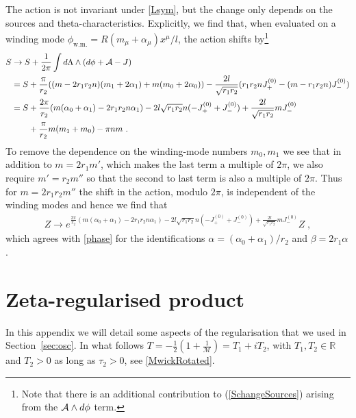 \documentclass[11pt]{article}
\numberwithin{equation}{section}
\begin{document}
\begin{appendix}
The action is not invariant under \eqref{Lsym}, but the change only depends on the sources and theta-characteristics.  Explicitly, we find that, when evaluated on  a winding mode $\phi_{\text{w.m.}}=R(m_\mu+\alpha_\mu)x^\mu/l$, the action shifts by\footnote{Note that there is an additional contribution to (\ref{SchangeSources}) arising from the ${\cal A}\wedge d\phi$ term.}
\begin{align}
S &\to S + \frac{1}{2\pi}\int d\Lambda\wedge (d\phi+{\cal A}-J)  \nonumber\\
& = S +\frac{\pi}{r_2}((m -2r_1r_2n)(m_1+2\alpha_1)+m(m_0+2\alpha_0))
-\frac{2l}{\sqrt{r_1r_2}}(r_1r_2 n J_+^{(0)} -(m-r_1r_2n)J_-^{(0)})\nonumber\\
& = S + \frac{2\pi}{r_2}(m(\alpha_0+\alpha_1)- 2r_1r_2n\alpha_1)-2l\sqrt{r_1r_2} n(-J_+^{(0)}+J_-^{(0)})+\frac{2l}{\sqrt{r_1r_2}} m J_-^{(0)}\nonumber\\
&\qquad +\frac{\pi}{r_2}m(m_1+m_0)- \pi  n m  \ .
\end{align}
To remove the dependence on the winding-mode numbers $m_0,m_1$ we see that in addition to $m=2r_1m'$, which makes the last term a multiple of $2\pi$, we also require $m'=r_2m''$ so that the second to last term is also a multiple of $2\pi$.  Thus for $m=2r_1r_2m''$ the shift in the action, modulo $2\pi$, is independent of the winding modes and hence we find that 
\begin{align}
Z\to e^{\frac{2\pi}{r_2}(m(\alpha_0+\alpha_1)- 2r_1r_2n\alpha_1)-2l\sqrt{r_1r_2} n(-J_+^{(0)}+J_-^{(0)})+\frac{2l}{\sqrt{r_1r_2}} m J_-^{(0)}} Z \;,
\end{align}
which agrees with \eqref{phase} for the identifications $\alpha = (\alpha_0 + \alpha_1)/r_2$ and $\beta = 2 r_1 \alpha$.
 
  
\section{Zeta-regularised product}\label{sec:appen}

In this appendix we will detail some aspects of the regularisation that we used in Section~\ref{sec:osc}. In what follows $T= -\frac{1}{2}(1 + \frac{1}{\mathcal M})=T_1+i T_2$, with $T_1,T_2\in\mathbb{R}$ and $T_2>0$ as long as $\tau_2>0$, see \eqref{MwickRotated}.


\end{appendix}
\end{document}
